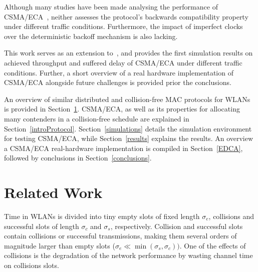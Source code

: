 \documentclass[a4paper,journal]{IEEEtran}
\begin{document}
Although many studies have been made analysing the performance of CSMA/ECA~\cite{barcelo2008lba,research2standards,bellalta2009vtc,E2CA_performance}, neither assesses the protocol's backwards compatibility property under different traffic conditions. Furthermore, the impact of imperfect clocks over the deterministic backoff mechanism is also lacking.


This work serves as an extension to~\cite{research2standards}, and provides the first simulation results on achieved throughput and suffered delay of CSMA/ECA under different traffic conditions. Further, a short overview of a real hardware implementation of CSMA/ECA alongside future challenges is provided prior the conclusions.



An overview of similar distributed and collision-free MAC protocols for WLANs is provided in  Section~\ref{relatedWork}. CSMA/ECA, as well as its properties for allocating many contenders in a collision-free schedule are explained in Section~\ref{introProtocol}. Section~\ref{simulations} details the simulation environment for testing CSMA/ECA, while Section~\ref{results} explains the results. An overview a CSMA/ECA real-hardware implementation is compiled in Section~\ref{EDCA}, followed by conclusions in Section~\ref{conclusions}.




\section{Related Work}\label{relatedWork}
Time in WLANs is divided into tiny empty slots of fixed length $\sigma_{e}$, collisions and successful slots of length $\sigma_{c}$ and $\sigma_{s}$, respectively. Collision and successful slots contain collisions or successful transmissions, making them several orders of magnitude larger than empty slots ($\sigma_{e}\ll\min(\sigma_{s},\sigma_{c}))$. One of the effects of collisions is the degradation of the network performance by wasting channel time on collisions slots. 
\end{document}
